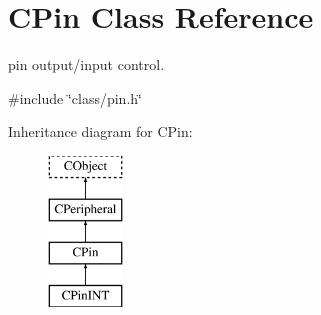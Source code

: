 \hypertarget{class_c_pin}{\section{C\-Pin Class Reference}
\label{class_c_pin}
}


pin output/input control.  




{\ttfamily \#include \char`\"{}class/pin.\-h\char`\"{}}

Inheritance diagram for C\-Pin\-:\begin{figure}[H]
\begin{center}
\leavevmode
\includegraphics[height=4.000000cm]{d7/db9/class_c_pin}
\end{center}
\end{figure}
